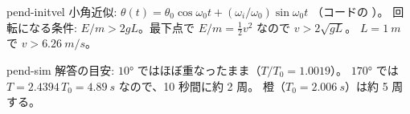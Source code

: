 \begin{solution}{pend-initvel}
小角近似: $\theta(t)=\theta_0\cos\omega_0t+(\omega_i/\omega_0)\sin\omega_0t$
（コードの ）。
回転になる条件: $E/m>2gL$。最下点で $E/m=\tfrac12v^2$ なので $v>2\sqrt{gL}$。
$L=\qty{1}{m}$ で $v>\qty{6.26}{m/s}$。
\end{solution}

\begin{solution}{pend-sim}
解答の目安: $\ang{10}$ ではほぼ重なったまま（$T/T_0=1.0019$）。
$\ang{170}$ では $T=2.4394\,T_0=\qty{4.89}{s}$ なので、10 秒間に約 2 周。
橙（$T_0=\qty{2.006}{s}$）は約 5 周する。
\end{solution}

